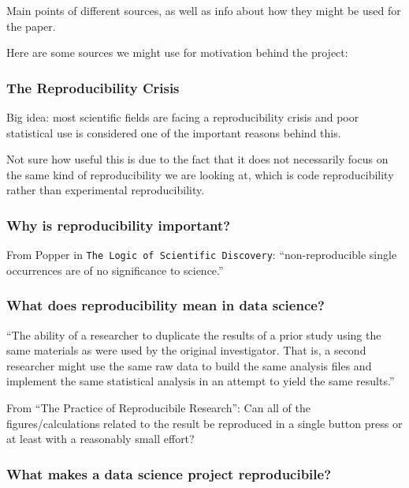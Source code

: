 \documentclass[12pt]{article}
\begin{document}
Main points of different sources, as well as info about how they might
be used for the paper.

Here are some sources we might use for motivation behind the project:

\subsubsection{The Reproducibility
Crisis}\label{the-reproducibility-crisis}

Big idea: most scientific fields are facing a reproducibility crisis and
poor statistical use is considered one of the important reasons behind
this.

Not sure how useful this is due to the fact that it does not necessarily
focus on the same kind of reproducibility we are looking at, which is
code reproducibility rather than experimental reproducibility.

\citet{baker20161}

\subsubsection{Why is reproducibility
important?}\label{why-is-reproducibility-important}

From Popper in \texttt{The\ Logic\ of\ Scientific\ Discovery}:
``non-reproducible single occurrences are of no significance to
science.''

\citet{popper2005logic}

\subsubsection{What does reproducibility mean in data
science?}\label{what-does-reproducibility-mean-in-data-science}

``The ability of a researcher to duplicate the results of a prior study
using the same materials as were used by the original investigator. That
is, a second researcher might use the same raw data to build the same
analysis files and implement the same statistical analysis in an attempt
to yield the same results.''

\citet{goodman2016does}

From ``The Practice of Reproducibile Research'': Can all of the
figures/calculations related to the result be reproduced in a single
button press or at least with a reasonably small effort?

\citet{kitzes2017practice}

\subsubsection{What makes a data science project
reproducibile?}\label{what-makes-a-data-science-project-reproducibile}
\end{document}
